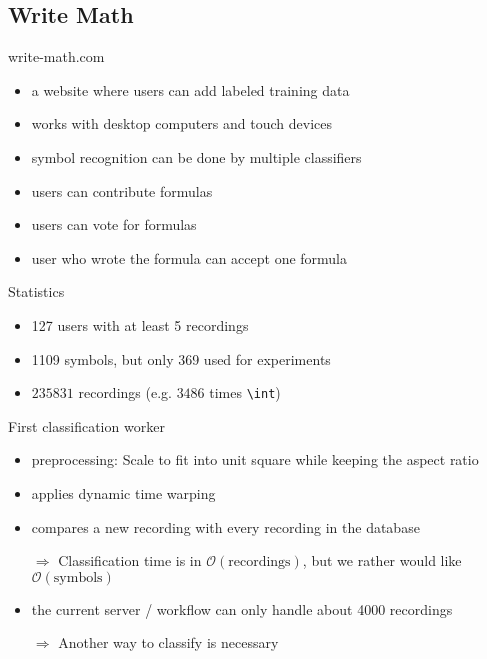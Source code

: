 \subsection{Write Math}

\begin{frame}{write-math.com}
    \begin{itemize}
        \item a website where users can add labeled training data
        \item works with desktop computers and touch devices
        \item symbol recognition can be done by multiple classifiers
        \item users can contribute formulas
        \item users can vote for formulas
        \item user who wrote the formula can accept one formula
    \end{itemize}
\end{frame}



\begin{frame}[fragile]{Statistics}
    \begin{itemize}
        \item 127 users with at least 5 recordings
        \item 1109 symbols, but only 369 used for experiments
        \item $\num{235831}$ recordings (e.g. $\num{3486}$ times \verb+\int+)
    \end{itemize}
\end{frame}

\begin{frame}{First classification worker}
    \begin{itemize}
        \item preprocessing: Scale to fit into unit square while keeping the aspect
              ratio
        \item applies dynamic time warping
        \item compares a new recording with every recording
              in the database
        \item[$\Rightarrow$] Classification time is in $\mathcal{O}(\text{recordings})$,
              but we rather would like $\mathcal{O}(\text{symbols})$
        \item the current server / workflow can only handle about 4000 recordings
        \item[$\Rightarrow$] Another way to classify is necessary
    \end{itemize}
\end{frame}